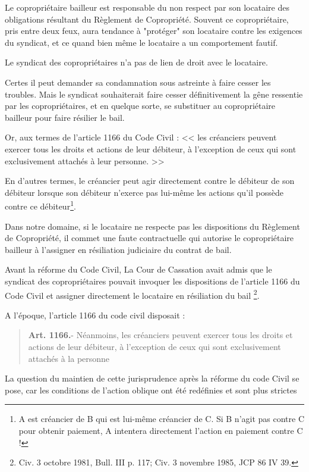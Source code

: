 			Le copropriétaire bailleur est responsable du non respect par son locataire des obligations résultant du Règlement de Copropriété. Souvent ce copropriétaire, pris entre deux feux, aura tendance à "protéger" son locataire contre les exigences du syndicat, et ce quand bien même le locataire a un comportement fautif.
			
			Le syndicat des copropriétaires n'a pas de lien de droit avec le locataire.
			
			Certes il peut demander sa condamnation sous astreinte à faire cesser les troubles. Mais le syndicat souhaiterait faire cesser définitivement la gêne ressentie par les copropriétaires, et en quelque sorte, se substituer au copropriétaire bailleur pour faire résilier le bail.
			
			Or, aux termes de l'article 1166 du Code Civil : << les créanciers peuvent exercer tous les droits et actions de leur débiteur, à l'exception de ceux qui sont exclusivement attachés à leur personne. >>
			
			En d'autres termes, le créancier peut agir directement contre le débiteur de son débiteur lorsque son débiteur n'exerce pas lui-même les actions qu'il possède contre ce débiteur\footnote{A est créancier de B qui est lui-même créancier de C. Si B n'agit pas contre C pour obtenir paiement, A intentera directement l'action en paiement contre C !}.
			
			Dans notre domaine, si le locataire ne respecte pas les dispositions du Règlement de Copropriété, il commet une faute contractuelle qui autorise le copropriétaire bailleur à l'assigner en résiliation judiciaire du contrat de bail.
		
			Avant la réforme du Code Civil, La Cour de Cassation avait admis que le syndicat des copropriétaires pouvait invoquer les dispositions de l'article 1166 du Code Civil et assigner directement le locataire en résiliation du bail \footnote{Civ. 3 octobre 1981, Bull. III  p. 117; Civ. 3 novembre 1985, JCP 86 IV 39.}.
			
			A l’époque, l’article 1166 du code civil disposait :
			\begin{quote}
				\textbf{Art. 1166.}- Néanmoins, les créanciers peuvent exercer tous les droits et actions de leur débiteur, à l’exception de ceux qui sont exclusivement attachés à la personne
			\end{quote}
			
			La question du maintien de cette jurisprudence après la réforme du code Civil se pose, car les conditions de l’action oblique ont été redéfinies et sont plus strictes
				
